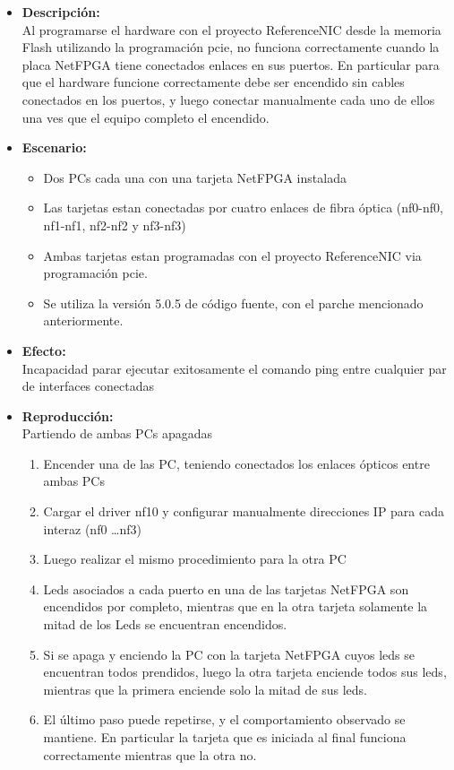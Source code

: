 \begin{itemize}
\item \textbf{Descripci\'on:}\\
Al programarse el hardware con el proyecto ReferenceNIC desde la memoria Flash utilizando la programaci\'on pcie, no funciona correctamente cuando la placa NetFPGA tiene conectados enlaces en sus puertos. En particular para que el hardware funcione correctamente debe ser encendido sin cables conectados en los puertos, y luego conectar manualmente cada uno de ellos una ves que el equipo completo el encendido.

\item \textbf{Escenario:}
\begin{itemize}
\item Dos PCs cada una con una tarjeta NetFPGA instalada
\item Las tarjetas estan conectadas por cuatro enlaces de fibra \'optica (nf0-nf0, nf1-nf1, nf2-nf2 y nf3-nf3)
\item Ambas tarjetas estan programadas con el proyecto ReferenceNIC via programaci\'on pcie.
\item Se utiliza la versi\'on 5.0.5 de c\'odigo fuente, con el parche mencionado anteriormente.
\end{itemize}

\item \textbf{Efecto:}\\
Incapacidad parar ejecutar exitosamente el comando ping entre cualquier par de interfaces conectadas

\item \textbf{Reproducci\'on:}\\
Partiendo de ambas PCs apagadas
\begin{enumerate}
\item Encender una de las PC, teniendo conectados los enlaces \'opticos entre ambas PCs
\item Cargar el driver nf10 y configurar manualmente direcciones IP para cada interaz (nf0 \dots nf3)
\item Luego realizar el mismo procedimiento para la otra PC
\item Leds asociados a cada puerto en una de las tarjetas NetFPGA son encendidos por completo, mientras que en la otra tarjeta solamente la mitad de los Leds se encuentran encendidos.
\item Si se apaga y enciendo la PC con la tarjeta NetFPGA cuyos leds se encuentran todos prendidos, luego la otra tarjeta enciende todos sus leds, mientras que la primera enciende solo la mitad de sus leds. 
\item El \'ultimo paso puede repetirse, y el comportamiento observado se mantiene. En particular la tarjeta que es iniciada al final funciona correctamente mientras que la otra no.
\end{enumerate} 


\end{itemize}
